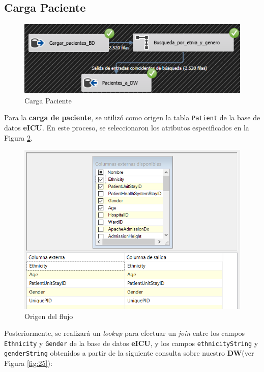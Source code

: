 \documentclass[12pt, a4paper, twoside]{article}
\begin{document}
	\subsection{Carga Paciente}
	
	
	\begin{figure}[h!]
		\centering
		\includegraphics[width=1\textwidth]{image/108_carga_paciente.png}
		\caption{Carga Paciente}
		\label{fig:17}
	\end{figure}
	
	Para la \textbf{carga de paciente}, se utilizó como origen la tabla \texttt{Patient} de la base de datos \textbf{eICU}. En este proceso, se seleccionaron los atributos especificados en la Figura \ref{fig:24}.
	
	\begin{figure}[h!]
		\centering
		\includegraphics[width=1\textwidth]{image/108_carga_paciente_origen.png}
		\caption{Origen del flujo}
		\label{fig:24}
	\end{figure}
	
	Posteriormente, se realizará un \textit{lookup} para efectuar un \textit{join} entre los campos \texttt{Ethnicity} y \texttt{Gender} de la base de datos \textbf{eICU}, y los campos \texttt{ethnicityString} y \texttt{genderString} obtenidos a partir de la siguiente consulta sobre nuestro \textbf{DW}(ver Figura \ref{fig:25}):
	
\end{document}
